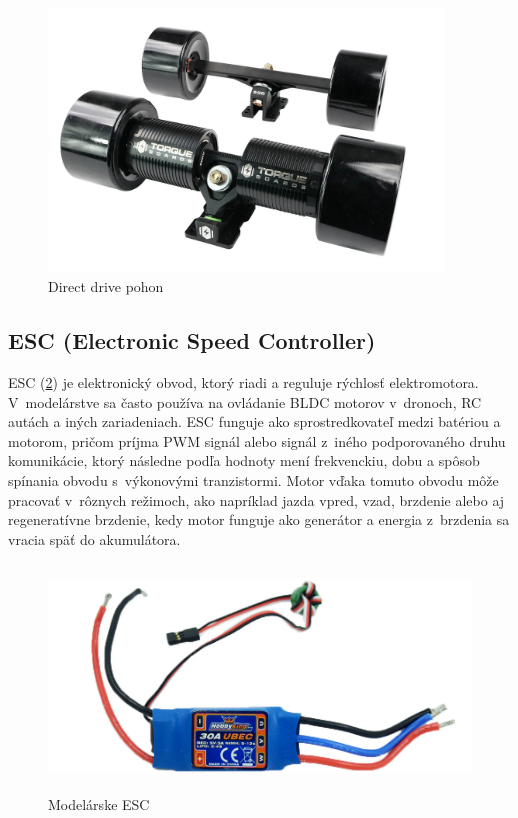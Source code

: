 \begin{figure}[h]
    \centering
    \includegraphics[height=7cm, width=1\linewidth, keepaspectratio]{obrazky-figures/drive-direct.png}
    \caption{Direct drive pohon\cite{TorqueBoards}}\label{fig:direct-drive}
\end{figure}

\newpage

\subsection{ESC (Electronic Speed Controller)}
ESC (\ref{fig:esc}) je elektronický obvod, ktorý riadi a reguluje rýchlosť elektromotora.
V~modelárstve sa často používa na ovládanie BLDC motorov v~dronoch, RC autách a iných zariadeniach. 
ESC funguje ako sprostredkovateľ medzi batériou a motorom, pričom príjma PWM signál alebo signál z~iného podporovaného druhu komunikácie, ktorý následne podľa hodnoty mení frekvenckiu, dobu a spôsob spínania obvodu s~výkonovými tranzistormi.
Motor vďaka tomuto obvodu môže pracovať v~rôznych režimoch, ako napríklad jazda vpred, vzad, brzdenie alebo aj regeneratívne brzdenie, kedy motor funguje ako generátor a energia z~brzdenia sa vracia späť do akumulátora.\cite{Lauren}

\begin{figure}[h]
    \centering
    \includegraphics[height=6cm]{obrazky-figures/esc.png}
    \caption{Modelárske ESC\cite{Lauren}}\label{fig:esc}
\end{figure}


